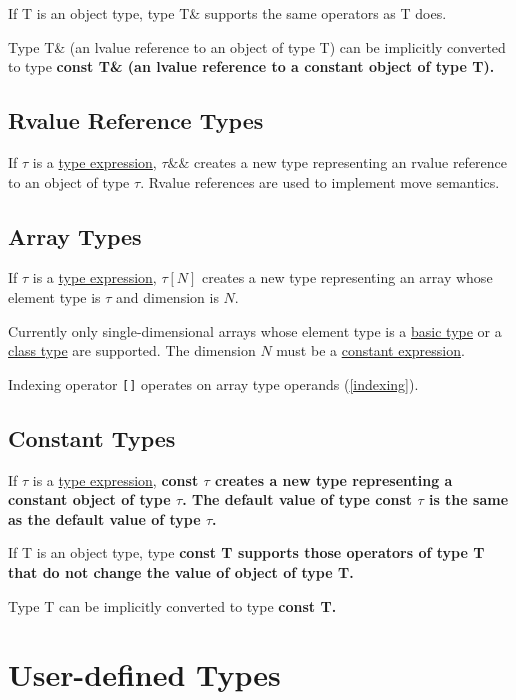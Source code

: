 \documentclass[a4paper,oneside,11pt]{article}
\begin{document}
If T is an object type, type T\& supports the same operators as T does.

Type T\& (an lvalue reference to an object of type T) can be implicitly converted to type \bf{const} T\&
(an lvalue reference to a constant object of type T).

\subsection{Rvalue Reference Types}\label{sec:rvaluereferencetypes}

If $\tau$ is a \hyperref[typeexpr]{type expression}, $\tau\&\&$ creates a new type representing an rvalue reference to an object of type $\tau$.
Rvalue references are used to implement move semantics.

\subsection{Array Types}\label{sec:arraytypes}

If $\tau$ is a \hyperref[typeexpr]{type expression}, $\tau[N]$ creates a new type representing an array whose element type is $\tau$ and dimension is $N$.

Currently only single-dimensional arrays whose element type is a \hyperref[basictype]{basic type} or
a \hyperref[sec:classtypes]{class type} are supported.
The dimension $N$ must be a \hyperref[constantexpr]{constant expression}.

Indexing operator \texttt{[]} operates on array type operands (\ref{indexing}).

\subsection{Constant Types}

If $\tau$ is a \hyperref[typeexpr]{type expression}, \bf{const} $\tau$ creates a new type representing a constant object of type $\tau$.
The default value of type \bf{const} $\tau$ is the same as the default value of type $\tau$.

If T is an object type, type \bf{const} T supports those operators of type T that do not change the value of object of type T.

Type T can be implicitly converted to type \bf{const} T.

\section{User-defined Types}
\end{document}
